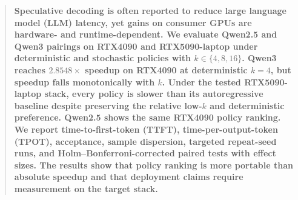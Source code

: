 \begin{abstract}
\bfseries\boldmath
Speculative decoding is often reported to reduce large language model (LLM)
latency, yet gains on consumer GPUs are hardware- and runtime-dependent. We
evaluate Qwen2.5 and Qwen3 pairings on RTX4090 and RTX5090-laptop under
deterministic and stochastic policies with $k\in\{4,8,16\}$. Qwen3 reaches
$2.8548\times$ speedup on RTX4090 at deterministic $k{=}4$, but speedup falls
monotonically with $k$. Under the tested RTX5090-laptop stack, every policy is
slower than its autoregressive baseline despite preserving the relative
low-$k$ and deterministic preference. Qwen2.5 shows the same RTX4090 policy
ranking. We report time-to-first-token (TTFT), time-per-output-token (TPOT), acceptance, sample dispersion, targeted
repeat-seed runs, and Holm--Bonferroni-corrected paired tests with effect
sizes. The results show that policy ranking is more portable than absolute
speedup and that deployment claims require measurement on the target stack.
\end{abstract}
